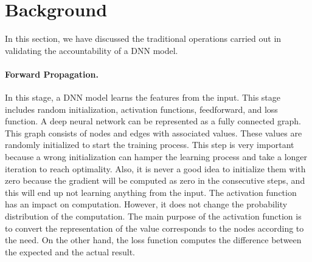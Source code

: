 \section{Background}
\label{sec:background}
In this section, we have discussed the traditional operations carried out in validating the accountability of a DNN model.
\paragraph{Forward Propagation.}  In this stage, a DNN model learns the features from the input. This stage includes random initialization, activation functions, feedforward, and loss function. 
A deep neural network can be represented as a fully connected graph. 
This graph consists of nodes and edges with associated values. These values are randomly initialized to start the training process. This step is very important because a wrong initialization can hamper the learning process and take a longer iteration to reach optimality. Also, it is never a good idea to initialize them with zero because the gradient will be computed as zero in the consecutive steps, and this will end up not learning anything from the input. The activation function has an impact on computation. However, it does not change the probability distribution of the computation. The main purpose of the activation function is to convert the representation of the value corresponds to the nodes according to the need. On the other hand, the loss function computes the difference between the expected and the actual result.
